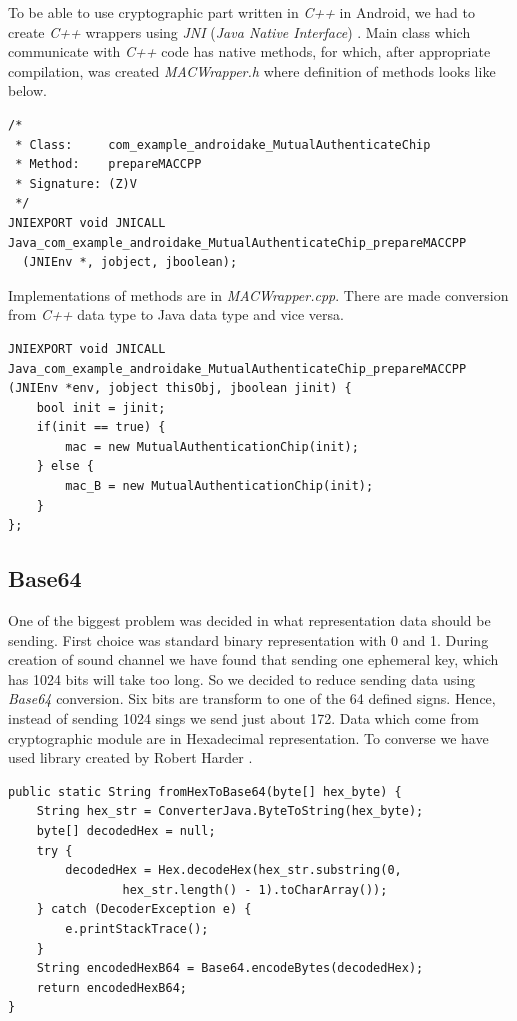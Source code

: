 \documentclass[11pt,titlepage]{article}
\theoremstyle{plain}
\begin{document}
To be able to use cryptographic part written in \textit{C++} in Android, we had to create \textit{C++} wrappers using \textit{JNI} (\textit{Java Native Interface}) \cite{JNI}. Main class which communicate with \textit{C++} code has native methods, for which, after appropriate compilation, was created \textit{MACWrapper.h} where definition of methods looks like below.

\begin{lstlisting}
/*
 * Class:     com_example_androidake_MutualAuthenticateChip
 * Method:    prepareMACCPP
 * Signature: (Z)V
 */
JNIEXPORT void JNICALL Java_com_example_androidake_MutualAuthenticateChip_prepareMACCPP
  (JNIEnv *, jobject, jboolean);
\end{lstlisting}

Implementations of methods are in \textit{MACWrapper.cpp}. There are made conversion from \textit{C++} data type to Java data type and vice versa.

\begin{lstlisting}
JNIEXPORT void JNICALL Java_com_example_androidake_MutualAuthenticateChip_prepareMACCPP
(JNIEnv *env, jobject thisObj, jboolean jinit) {
	bool init = jinit;
	if(init == true) {
		mac = new MutualAuthenticationChip(init);
	} else {
		mac_B = new MutualAuthenticationChip(init);
	}
};
\end{lstlisting}

\subsection{Base64}

One of the biggest problem was decided in what representation data should be sending. First choice was standard binary representation with 0 and 1. During creation of sound channel we have found that sending one ephemeral key, which has 1024 bits will take too long. So we decided to reduce sending data using \textit{Base64} conversion. Six bits are transform to one of the 64 defined signs. Hence, instead of sending 1024 sings we send just about 172. Data which come from cryptographic module are in Hexadecimal representation. To converse we have used library created by Robert Harder \cite{base_64}. 

\begin{lstlisting}[caption={Example of code converting from Hex String to Base64 String}]
public static String fromHexToBase64(byte[] hex_byte) {
	String hex_str = ConverterJava.ByteToString(hex_byte);
	byte[] decodedHex = null;
	try {
		decodedHex = Hex.decodeHex(hex_str.substring(0,
				hex_str.length() - 1).toCharArray());
	} catch (DecoderException e) {
		e.printStackTrace();
	}
	String encodedHexB64 = Base64.encodeBytes(decodedHex);
	return encodedHexB64;
}
\end{lstlisting}
\end{document}
